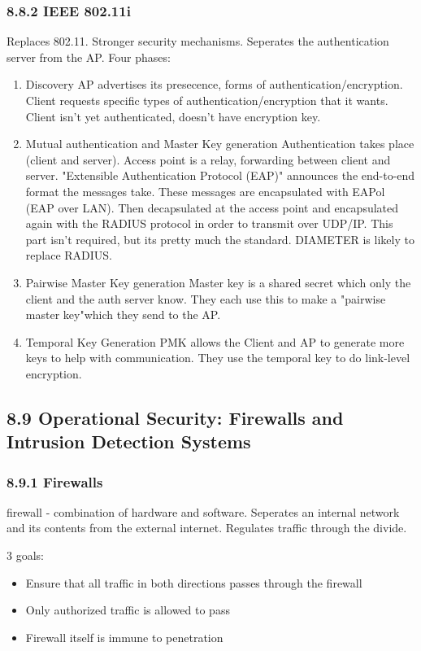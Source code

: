 \documentclass[11pt]{article}
\begin{document}
\subsubsection{8.8.2 IEEE 802.11i}
\label{sec:org6571e07}
Replaces 802.11. Stronger security mechanisms. Seperates the authentication server from the AP.
Four phases:
\begin{enumerate}
\item Discovery
AP advertises its presecence, forms of authentication/encryption. Client requests specific types of authentication/encryption that it wants. Client isn't yet authenticated, doesn't have encryption key.
\item Mutual authentication and Master Key generation
Authentication takes place (client and server). Access point is a relay, forwarding between client and server. "Extensible Authentication Protocol (EAP)" announces the end-to-end format the messages take. These messages are encapsulated with EAPol (EAP over LAN). Then decapsulated at the access point and encapsulated again with the RADIUS protocol in order to transmit over UDP/IP. This part isn't required, but its pretty much the standard. DIAMETER is likely to replace RADIUS.
\item Pairwise Master Key generation
Master key is a shared secret which only the client and the auth server know. They each use this to make a "pairwise master key"which they send to the AP.
\item Temporal Key Generation
PMK allows the Client and AP to generate more keys to help with communication. They use the temporal key to do link-level encryption.
\end{enumerate}



\subsection{8.9 Operational Security: Firewalls and Intrusion Detection Systems}
\label{sec:orgb22a5c0}

\subsubsection{8.9.1 Firewalls}
\label{sec:orgecf0ad2}
firewall - combination of hardware and software. Seperates an internal network and its contents from the external internet. Regulates traffic through the divide.

3 goals:
\begin{itemize}
\item Ensure that all traffic in both directions passes through the firewall
\item Only authorized traffic is allowed to pass
\item Firewall itself is immune to penetration
\end{itemize}
\end{document}
